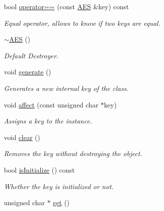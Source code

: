 \begin{DoxyCompactItemize}
bool \hyperlink{class_spider_1_1ssl_1_1_a_e_s_ad9014e425e6149e7006b8b309a933bc2}{operator==} (const \hyperlink{class_spider_1_1ssl_1_1_a_e_s}{A\+ES} \&key) const
\begin{DoxyCompactList}\small\item\em Equal operator, allows to know if two keys are equal. \end{DoxyCompactList}\item 
\mbox{\label{class_spider_1_1ssl_1_1_a_e_s_aab6bae111d14ed5ec7fe0cefbb8ba3cc}} 
\hyperlink{class_spider_1_1ssl_1_1_a_e_s_aab6bae111d14ed5ec7fe0cefbb8ba3cc}{$\sim$\+A\+ES} ()
\begin{DoxyCompactList}\small\item\em Default Destroyer. \end{DoxyCompactList}\item 
void \hyperlink{class_spider_1_1ssl_1_1_a_e_s_a3cba36653117622e01fedfafa9fb1c6a}{generate} ()
\begin{DoxyCompactList}\small\item\em Generates a new internal key of the class. \end{DoxyCompactList}\item 
void \hyperlink{class_spider_1_1ssl_1_1_a_e_s_a16b092b57a8906edc6845176eed10256}{affect} (const unsigned char $\ast$key)
\begin{DoxyCompactList}\small\item\em Assigns a key to the instance. \end{DoxyCompactList}\item 
\mbox{\label{class_spider_1_1ssl_1_1_a_e_s_aa6c03237be40637cae04f0ec9161bc79}} 
void \hyperlink{class_spider_1_1ssl_1_1_a_e_s_aa6c03237be40637cae04f0ec9161bc79}{clear} ()
\begin{DoxyCompactList}\small\item\em Removes the key without destroying the object. \end{DoxyCompactList}\item 
bool \hyperlink{class_spider_1_1ssl_1_1_a_e_s_a93e682bc36f5a52d75289fd43c2404f6}{is\+Initialize} () const
\begin{DoxyCompactList}\small\item\em Whether the key is initialized or not. \end{DoxyCompactList}\item 
unsigned char $\ast$ \hyperlink{class_spider_1_1ssl_1_1_a_e_s_af29f6f29119e34fcf27605ed85a3460d}{get} ()

\end{DoxyCompactItemize}

